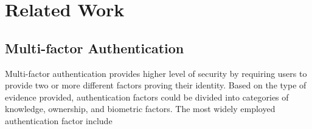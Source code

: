 \section{Related Work}
\subsection{Multi-factor Authentication}
Multi-factor authentication provides higher level of security by requiring users to provide two or more different factors proving their identity. Based on the type of evidence provided, authentication factors could be divided into categories of knowledge, ownership, and biometric factors\cite{ometov2018multi}. The most widely employed authentication factor include 



 


